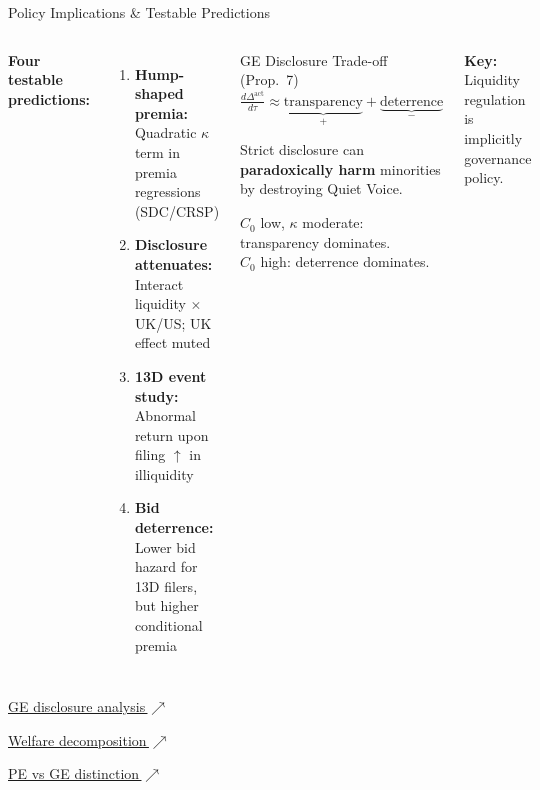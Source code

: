 \documentclass[aspectratio=169,10pt]{beamer}
\newcommand{\1}{\mathbf{1}}
\newcommand{\backuplink}[2]{%
  \hfill{\scriptsize\hyperlink{#1}{\textcolor{brightblue}{#2\,$\nearrow$}}}%
}
\begin{document}
\begin{frame}{Policy Implications \& Testable Predictions}
\hypertarget{main:policy}{}
\footnotesize
\begin{columns}[T,onlytextwidth]
\textbf{Four testable predictions:}
\begin{enumerate}\itemsep0.15em
  \item \textbf{Hump-shaped premia:} Quadratic $\kappa$ term in premia regressions (SDC/CRSP)
  \item \textbf{Disclosure attenuates:} Interact liquidity $\times$ UK/US; UK effect muted
  \item \textbf{13D event study:} Abnormal return upon filing $\uparrow$ in illiquidity
  \item \textbf{Bid deterrence:} Lower bid hazard for 13D filers, but higher conditional premia
\end{enumerate}

\begin{block}{GE Disclosure Trade-off (Prop.\ 7)}
\vspace{-0.2em}
{\footnotesize
$\frac{d\Delta^{\text{act}}}{d\tau} \approx \underbrace{\text{transparency}}_{{+}} + \underbrace{\text{deterrence}}_{{-}}$
}

\vspace{0.2em}
{\small Strict disclosure can \textbf{paradoxically harm} minorities by destroying Quiet Voice.}

\vspace{0.2em}
{\small $C_0$ low, $\kappa$ moderate: transparency dominates.\\
$C_0$ high: deterrence dominates.}
\vspace{-0.2em}
\end{block}

\vspace{0.1em}
\textbf{Key:} Liquidity regulation is implicitly governance policy.
\end{columns}

\backuplink{backup:GE_disclosure}{GE disclosure analysis}
\backuplink{backup:welfare}{Welfare decomposition}
\backuplink{backup:PE_vs_GE}{PE vs GE distinction}
\end{frame}
\end{document}
